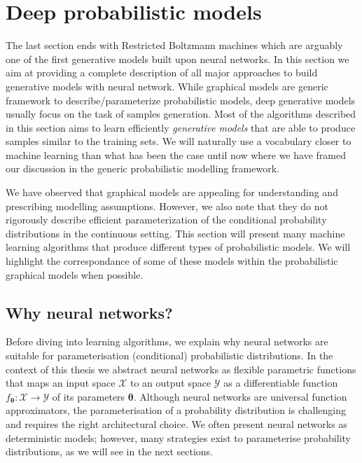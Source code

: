 \section{Deep probabilistic models}
The last section ends with Restricted Boltzmann machines which are arguably one of the first generative models built upon neural networks. In this section we aim at providing a complete description of all major approaches to build generative models with neural network. While graphical models are generic framework to describe/parameterize probabilistic models, deep generative models usually focus on the task of samples generation. Most of the algorithms described in this section aims to learn efficiently \textit{generative models} that are able to produce samples similar to the training sets. We will naturally use a vocabulary closer to machine learning than what has been the case until now where we have framed our discussion in the generic probabilistic modelling framework.

We have observed that graphical models are appealing for understanding and prescribing modelling assumptions. However, we also note that they do not rigorously describe efficient parameterization of the conditional probability distributions in the continuous setting. This section will present many machine learning algorithms that produce different types of probabilistic models. We will highlight the correspondance of some of these models within the probabilistic graphical models when possible.
\subsection{Why neural networks?}
Before diving into learning algorithms, we explain why neural networks are suitable for parameterisation (conditional) probabilistic distributions. In the context of this thesis we abstract neural networks as flexible parametric functions that maps an input space $\mathcal{X}$ to an output space $\mathcal{Y}$ as a differentiable function $f_{\bm{\theta}}: \mathcal{X} \rightarrow \mathcal{Y}$ of its parameters $\bm{\theta}$. Although neural networks are universal function approximators, the parameterisation of a probability distribution is challenging and requires the right architectural choice. We often present neural networks as deterministic models; however, many strategies exist to parameterise probability distributions, as we will see in the next sections.

